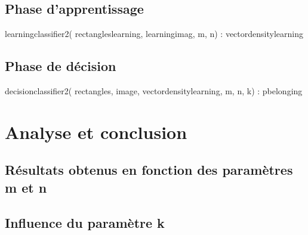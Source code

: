\subsection{Phase d'apprentissage}

learningclassifier2( rectangleslearning, learningimag, m, n) : vectordensitylearning


\subsection{Phase de décision}

decisionclassifier2( rectangles, image, vectordensitylearning, m, n, k) : pbelonging


\section{Analyse et conclusion}

\subsection{Résultats obtenus en fonction des paramètres m et n}

\subsection{Influence du paramètre k}
